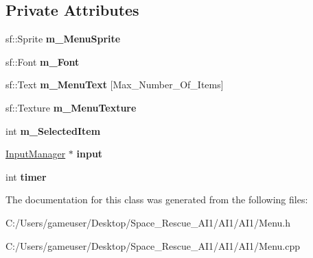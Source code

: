 \subsection*{Private Attributes}
\begin{DoxyCompactItemize}
\item 
\mbox{\label{class_menu_ae09b0e1f187a67703d2b9c1d6ceb6005}} 
sf\+::\+Sprite {\bfseries m\+\_\+\+Menu\+Sprite}
\item 
\mbox{\label{class_menu_a7eb09c700c4f58bcc9d67c3ddf545dc8}} 
sf\+::\+Font {\bfseries m\+\_\+\+Font}
\item 
\mbox{\label{class_menu_aa0113c86ae6aa6feeb2a375807868869}} 
sf\+::\+Text {\bfseries m\+\_\+\+Menu\+Text} \mbox{[}Max\+\_\+\+Number\+\_\+\+Of\+\_\+\+Items\mbox{]}
\item 
\mbox{\label{class_menu_adcca3739131fbea24e4a5567f8be32e7}} 
sf\+::\+Texture {\bfseries m\+\_\+\+Menu\+Texture}
\item 
\mbox{\label{class_menu_abab50eb924bd4907f76b259729e13651}} 
int {\bfseries m\+\_\+\+Selected\+Item}
\item 
\mbox{\label{class_menu_a20188bf91345512ce465cfa4e25b0ccd}} 
\hyperlink{class_input_manager}{Input\+Manager} $\ast$ {\bfseries input}
\item 
\mbox{\label{class_menu_a751ca93eea16413fa896e634757aaf1c}} 
int {\bfseries timer}
\end{DoxyCompactItemize}


The documentation for this class was generated from the following files\+:\begin{DoxyCompactItemize}
\item 
C\+:/\+Users/gameuser/\+Desktop/\+Space\+\_\+\+Rescue\+\_\+\+A\+I1/\+A\+I1/\+A\+I1/Menu.\+h\item 
C\+:/\+Users/gameuser/\+Desktop/\+Space\+\_\+\+Rescue\+\_\+\+A\+I1/\+A\+I1/\+A\+I1/Menu.\+cpp\end{DoxyCompactItemize}
